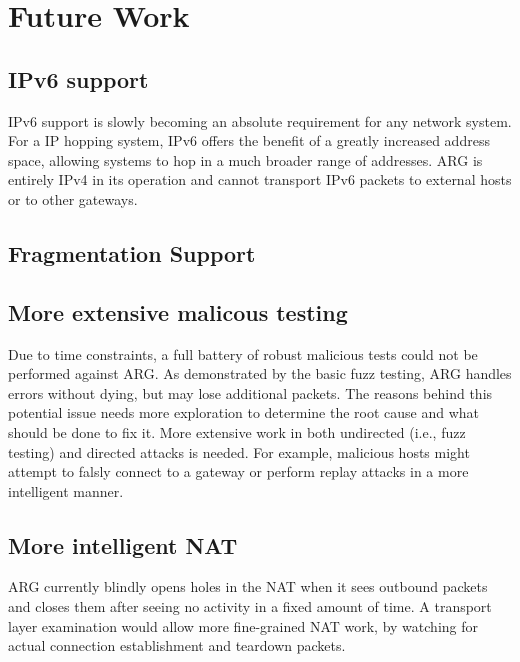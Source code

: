 \section{Future Work}
\label{sec:future_work}
\subsection{IPv6 support}
\par \ac{IPv6} support is slowly becoming an absolute requirement for any network system. For a \ac{IP} hopping system, \ac{IPv6} offers the benefit of a greatly increased address space, allowing systems to hop in a much broader range of addresses. \ac{ARG} is entirely \ac{IPv4} in its operation and cannot transport \ac{IPv6} packets to external hosts or to other gateways.

\subsection{Fragmentation Support}
\par {}

\subsection{More extensive malicous testing}
\par Due to time constraints, a full battery of robust malicious tests could not be performed against \ac{ARG}. As demonstrated by the basic fuzz testing, \ac{ARG} handles errors without dying, but may lose additional packets. The reasons behind this potential issue needs more exploration to determine the root cause and what should be done to fix it. More extensive work in both undirected (i.e., fuzz testing) and directed attacks is needed. For example, malicious hosts might attempt to falsly connect to a gateway or perform replay attacks in a more intelligent manner.  


\subsection{More intelligent NAT}
\par \ac{ARG} currently blindly opens holes in the \ac{NAT} when it sees outbound packets and closes them after seeing no activity in a fixed amount of time. A transport layer examination would allow more fine-grained \ac{NAT} work, by watching for actual connection establishment and teardown packets. 


